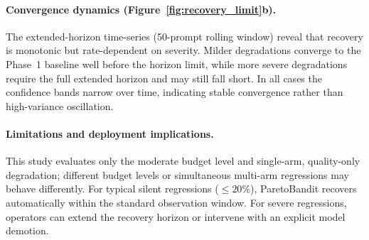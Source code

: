 \paragraph{Convergence dynamics (Figure~\ref{fig:recovery_limit}b).}
The extended-horizon time-series (50-prompt rolling window) reveal that recovery is monotonic but rate-dependent on severity.  Milder degradations converge to the Phase~1 baseline well before the horizon limit, while more severe degradations require the full extended horizon and may still fall short.  In all cases the confidence bands narrow over time, indicating stable convergence rather than high-variance oscillation.

\paragraph{Limitations and deployment implications.}
This study evaluates only the moderate budget level and single-arm, quality-only degradation; different budget levels or simultaneous multi-arm regressions may behave differently.
For typical silent regressions (${\leq}20$\%), ParetoBandit recovers automatically within the standard observation window.  For severe regressions, operators can extend the recovery horizon or intervene with an explicit model demotion.
